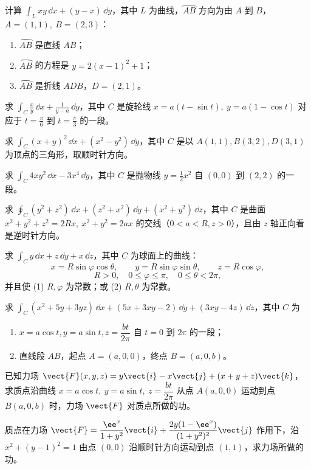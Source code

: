 \begin{xexercise}[1]
计算 $\displaystyle\int_Lxy\,\dd x+(y-x)\,\dd y$，其中 $L$ 为曲线，$\wideparen{AB}$ 方向为由 $A$ 到 $B$，$A=(1,1),\ B=(2,3)$：
\begin{enumerate}[label=(\arabic*)]
  \item $\wideparen{AB}$ 是直线 $AB$；
  \item $\wideparen{AB}$ 的方程是 $y=2(x-1)^2+1$；
  \item $\wideparen{AB}$ 是折线 $ADB$，$D=(2,1)$。
\end{enumerate}
\end{xexercise}\begin{xexercise}[2]
求 $\displaystyle\int_C\frac{x}{y}\,\dd x+\frac1{y-a}\,\dd y$，其中 $C$ 是旋轮线 $x=a(t-\sin t),\ y=a(1-\cos t)$ 对应于 $t=\frac\pi6$ 到 $t=\frac\pi3$ 的一段。
\end{xexercise}\begin{xexercise}[3]
求 $\displaystyle\int_C(x+y)^2\,\dd x+(x^2-y^2)\,\dd y$，其中 $C$ 是以 $A(1,1),B(3,2),D(3,1)$ 为顶点的三角形，取顺时针方向。
\end{xexercise}\begin{xexercise}[4]
求 $\displaystyle\int_C4xy^2\,\dd x-3x^4\,\dd y$，其中 $C$ 是抛物线 $y=\frac12x^2$ 自 $(0,0)$ 到 $(2,2)$ 的一段。
\end{xexercise}\begin{xexercise}[5]
求 $\displaystyle\oint_C(y^2+z^2)\,\dd x+(z^2+x^2)\,\dd y+(x^2+y^2)\,\dd z$，其中 $C$ 是曲面 $x^2+y^2+z^2=2Rx,\ x^2+y^2=2ax$ 的交线（$0<a<R,z>0$），且由 $z$ 轴正向看是逆时针方向。
\end{xexercise}\begin{xexercise}[6]
求 $\displaystyle\int_C y\,\dd x+z\,\dd y+x\,\dd z$，其中 $C$ 为球面上的曲线：
\[
  x=R\sin\varphi\cos\theta,\qquad y=R\sin\varphi\sin\theta,\qquad z=R\cos\varphi,
\]
\[
  R>0,\quad0\le\varphi\le\pi,\quad0\le\theta<2\pi,
\]
并且使 (1) $R,\varphi$ 为常数；或 (2) $R,\theta$ 为常数。
\end{xexercise}\begin{xexercise}[7]
求 $\displaystyle\int_C(x^2+5y+3yz)\,\dd x+(5x+3xy-2)\,\dd y+(3xy-4z)\,\dd z$，其中 $C$ 为
\begin{enumerate}[label=(\arabic*)]
  \item $x=a\cos t,y=a\sin t,z=\dfrac{bt}{2\pi}$ 自 $t=0$ 到 $2\pi$ 的一段；
  \item 直线段 $AB$，起点 $A=(a,0,0)$，终点 $B=(a,0,b)$。
\end{enumerate}
\end{xexercise}\begin{xexercise}[8]
已知力场 $\vect{F}(x,y,z)=y\vect{i}-x\vect{j}+(x+y+z)\vect{k}$，求质点沿曲线 $x=a\cos t,\ y=a\sin t,\ z=\dfrac{bt}{2\pi}$ 从点 $A(a,0,0)$ 运动到点 $B(a,0,b)$ 时，力场 $\vect{F}$ 对质点所做的功。
\end{xexercise}\begin{xexercise}[9]
质点在力场 $\vect{F}=\dfrac{\ee^x}{1+y^2}\vect{i}+\dfrac{2y(1-\ee^x)}{(1+y^2)^2}\vect{j}$ 作用下，沿 $x^2+(y-1)^2=1$ 由点 $(0,0)$ 沿顺时针方向运动到点 $(1,1)$，求力场所做的功。
\end{xexercise}

